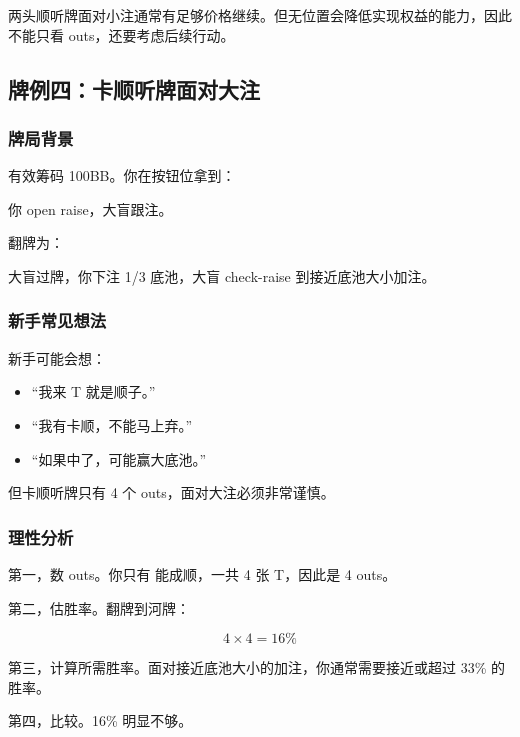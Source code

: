 两头顺听牌面对小注通常有足够价格继续。但无位置会降低实现权益的能力，因此不能只看 outs，还要考虑后续行动。

\subsection{牌例四：卡顺听牌面对大注}

\subsubsection*{牌局背景}

有效筹码 100BB。你在按钮位拿到：

\begin{center}
\end{center}

你 open raise，大盲跟注。

翻牌为：

\begin{center}
\end{center}

大盲过牌，你下注 1/3 底池，大盲 check-raise 到接近底池大小加注。

\subsubsection*{新手常见想法}

新手可能会想：

\begin{itemize}
\item “我来 T 就是顺子。”
\item “我有卡顺，不能马上弃。”
\item “如果中了，可能赢大底池。”
\end{itemize}

但卡顺听牌只有 4 个 outs，面对大注必须非常谨慎。

\subsubsection*{理性分析}

第一，数 outs。你只有  能成顺，一共 4 张 T，因此是 4 outs。

第二，估胜率。翻牌到河牌：

\[
4 \times 4 = 16\%
\]

第三，计算所需胜率。面对接近底池大小的加注，你通常需要接近或超过 33\% 的胜率。

第四，比较。16\% 明显不够。

